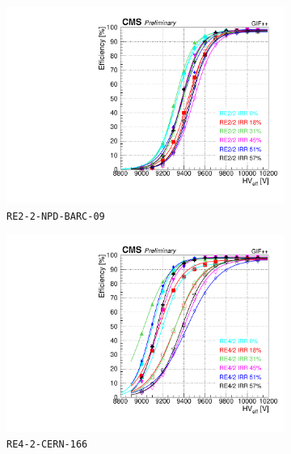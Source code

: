 	\begin{figure}[H]
    	\begin{subfigure}{0.5\linewidth}
			\centering
    		\includegraphics[width = \linewidth]{fig/chapt5/efficiency_vs_HVeff_RE2_2-IRR.pdf}
        	\caption{\label{fig:GIFpp_eff_vs_HVeff:A} \texttt{RE2-2-NPD-BARC-09}}
    	\end{subfigure}
    	\begin{subfigure}{0.5\linewidth}
			\centering
    		\includegraphics[width = \linewidth]{fig/chapt5/efficiency_vs_HVeff_RE4_2-IRR.pdf}
        	\caption{\label{fig:GIFpp_eff_vs_HVeff:B} \texttt{RE4-2-CERN-166}}
    	\end{subfigure}
    	\begin{subfigure}{0.5\linewidth}
			\centering

\end{subfigure}
\end{figure}

